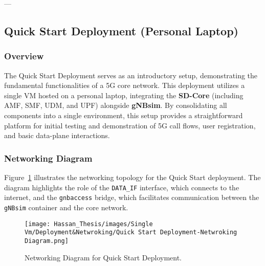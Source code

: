 ---

\subsection{Quick Start Deployment (Personal Laptop)}
\label{subsec:quickstart-deployment}

\subsubsection{Overview}
\label{subsubsec:qs-overview}

The Quick Start Deployment serves as an introductory setup, demonstrating the fundamental functionalities of a 5G core network. This deployment utilizes a single VM hosted on a personal laptop, integrating the \textbf{SD-Core} (including AMF, SMF, UDM, and UPF) alongside \textbf{gNBsim}. By consolidating all components into a single environment, this setup provides a straightforward platform for initial testing and demonstration of 5G call flows, user registration, and basic data-plane interactions.

\newpage
\subsubsection{Networking Diagram}
\label{subsubsec:qs-networking-diagram}
Figure~\ref{fig:quick-start-networking-diagram} illustrates the networking topology for the Quick Start deployment. The diagram highlights the role of the \texttt{DATA\_IF} interface, which connects to the internet, and the \texttt{gnbaccess} bridge, which facilitates communication between the \texttt{gNBsim} container and the core network.

\begin{figure}[H]
    \centering
    \texttt{[image: Hassan\_Thesis/images/Single Vm/Deployment\&Netwroking/Quick Start Deployment-Netwroking Diagram.png]}
    \caption{Networking Diagram for Quick Start Deployment.}
    \label{fig:quick-start-networking-diagram}
\end{figure}

